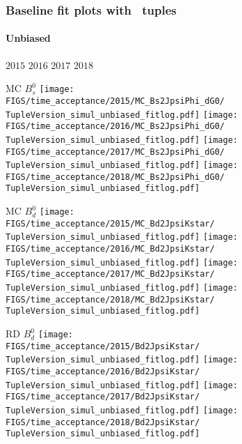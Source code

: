 \begin{frame} %
\frametitle{Baseline fit plots with \TupleVersion\, tuples}
\framesubtitle{Unbiased}

  \phantom{2020} \hspace*{1.5cm} $2015$ \hspace*{1.5cm} $2016$ \hspace*{1.5cm} $2017$ \hspace*{1.5cm} $2018$

  MC $B_s^0$
  \texttt{[image: \\FIGS/time\_acceptance/2015/MC\_Bs2JpsiPhi\_dG0/\\TupleVersion\_simul\_unbiased\_fitlog.pdf]}
  \texttt{[image: \\FIGS/time\_acceptance/2016/MC\_Bs2JpsiPhi\_dG0/\\TupleVersion\_simul\_unbiased\_fitlog.pdf]}
  \texttt{[image: \\FIGS/time\_acceptance/2017/MC\_Bs2JpsiPhi\_dG0/\\TupleVersion\_simul\_unbiased\_fitlog.pdf]}
  \texttt{[image: \\FIGS/time\_acceptance/2018/MC\_Bs2JpsiPhi\_dG0/\\TupleVersion\_simul\_unbiased\_fitlog.pdf]}
  \vspace*{2mm}

  MC $B_d^0$
  \texttt{[image: \\FIGS/time\_acceptance/2015/MC\_Bd2JpsiKstar/\\TupleVersion\_simul\_unbiased\_fitlog.pdf]}
  \texttt{[image: \\FIGS/time\_acceptance/2016/MC\_Bd2JpsiKstar/\\TupleVersion\_simul\_unbiased\_fitlog.pdf]}
  \texttt{[image: \\FIGS/time\_acceptance/2017/MC\_Bd2JpsiKstar/\\TupleVersion\_simul\_unbiased\_fitlog.pdf]}
  \texttt{[image: \\FIGS/time\_acceptance/2018/MC\_Bd2JpsiKstar/\\TupleVersion\_simul\_unbiased\_fitlog.pdf]}
  \vspace*{2mm}

  RD $B_d^0$
  \texttt{[image: \\FIGS/time\_acceptance/2015/Bd2JpsiKstar/\\TupleVersion\_simul\_unbiased\_fitlog.pdf]}
  \texttt{[image: \\FIGS/time\_acceptance/2016/Bd2JpsiKstar/\\TupleVersion\_simul\_unbiased\_fitlog.pdf]}
  \texttt{[image: \\FIGS/time\_acceptance/2017/Bd2JpsiKstar/\\TupleVersion\_simul\_unbiased\_fitlog.pdf]}
  \texttt{[image: \\FIGS/time\_acceptance/2018/Bd2JpsiKstar/\\TupleVersion\_simul\_unbiased\_fitlog.pdf]}

\end{frame} %



